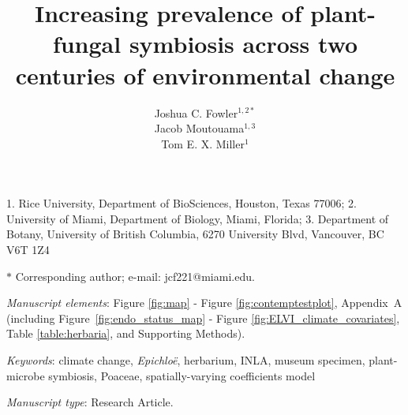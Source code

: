 \documentclass[11pt]{article}
\title{Increasing prevalence of plant-fungal symbiosis across two centuries of environmental change}
\author{Joshua C. Fowler$^{1,2\ast}$ \\
	Jacob Moutouama$^{1,3}$\\
	Tom E. X. Miller$^{1}$}
\date{}
\begin{document}
	
	\maketitle
	
	\noindent{} 1. Rice University, Department of BioSciences, Houston, Texas 77006;
	\noindent{} 2. University of Miami, Department of Biology, Miami, Florida;
	\noindent{} 3. Department of Botany, University  of British Columbia, 6270 University Blvd, Vancouver, BC V6T 1Z4


	\noindent{} $\ast$ Corresponding author; e-mail: jcf221@miami.edu.
	
	\bigskip
	
	\textit{Manuscript elements}: Figure \ref{fig:map} - Figure \ref{fig:contemptestplot}, Appendix~A (including Figure~\ref{fig:endo_status_map} - Figure \ref{fig:ELVI_climate_covariates},  Table \ref{table:herbaria}, and Supporting Methods).
	
	\bigskip
	
	\textit{Keywords}: climate change, \emph{Epichloë}, herbarium, INLA, museum specimen, plant-microbe symbiosis, Poaceae, spatially-varying coefficients model
	
	\bigskip
	
	\textit{Manuscript type}: Research Article. %
	
	\bigskip

	
	
	\newpage{}
	
\end{document}

